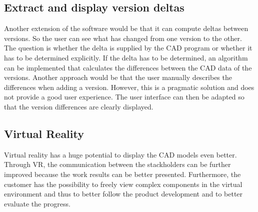 \subsection*{Extract and display version deltas}
Another extension of the software would be that it can compute deltas between versions. So the user can see what has changed from one version to the other. The question is whether the delta is supplied by the CAD program or whether it has to be determined explicitly. If the delta has to be determined, an algorithm can be implemented that calculates the differences between the CAD data of the versions. Another approach would be that the user manually describes the differences when adding a version. However, this is a pragmatic solution and does not provide a good user experience. The user interface can then be adapted so that the version differences are clearly displayed.

\subsection*{Virtual Reality}
Virtual reality has a huge potential to display the CAD models even better. Through VR, the communication between the stackholders can be further improved because the work results can be better presented. Furthermore, the customer has the possibility to freely view complex components in the virtual environment and thus to better follow the product development and to better evaluate the progress.

